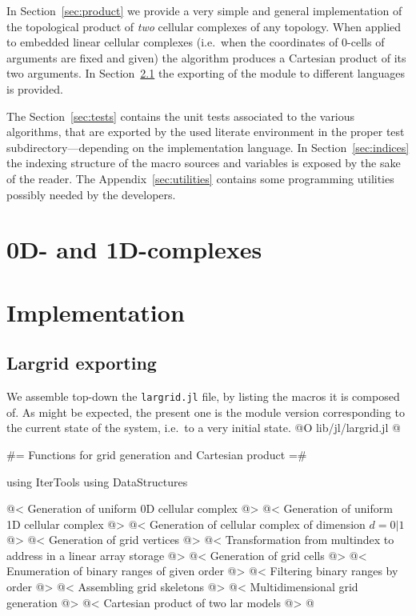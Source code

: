 In Section~\ref{sec:product} we provide a very simple and general implementation of the topological product of \emph{two} cellular complexes of any topology. When applied to embedded linear cellular complexes (i.e.~when the coordinates of 0-cells of arguments are fixed and given) the algorithm produces a Cartesian product of its two arguments.
In Section~\ref{sec:largrid} the exporting of the module to different languages is provided.

The Section~\ref{sec:tests} contains the unit tests associated to the various algorithms, that are exported by the used literate environment in the proper test subdirectory---depending on the implementation language.
In Section~\ref{sec:indices} the indexing structure of the macro sources and variables is exposed by the sake of the reader. 
The Appendix~\ref{sec:utilities} contains some programming utilities possibly needed by the developers.


\section{0D- and 1D-complexes}
\label{sec:0-1-complexes}

\section{Implementation}

\subsection{Largrid exporting}
\label{sec:largrid}
We assemble top-down the \texttt{largrid.jl} file, by listing the macros it is composed of. 
As might be expected, the present one is the module version corresponding to the current state of the system, i.e.~to a very initial state.
@O lib/jl/largrid.jl
@{
#= Functions for grid generation and Cartesian product =#

using IterTools
using DataStructures

@< Generation of uniform 0D cellular complex  @>
@< Generation of uniform 1D cellular complex  @>
@< Generation of cellular complex of dimension $d = 0 | 1$ @>
@< Generation of grid vertices  @>
@< Transformation from multindex to address in a linear array storage @>
@< Generation of grid cells  @>
@< Enumeration of binary ranges of given order @>
@< Filtering binary ranges by order @>
@< Assembling grid skeletons @>
@< Multidimensional grid generation @>
@< Cartesian product of two lar models   @>
@}




